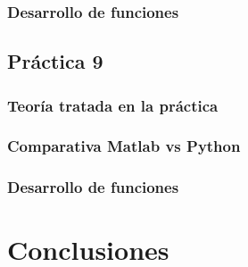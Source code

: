 \documentclass[a4paper,12pt]{report}
\begin{document}
\subsection{Desarrollo de funciones}

\section{ Práctica 9}
\subsection{Teoría tratada en la práctica}
\subsection{Comparativa Matlab vs Python}
\subsection{Desarrollo de funciones}


\chapter{Conclusiones}

\nocite{*}
\printbibliography[heading=bibintoc,title={Bibliography}]
\end{document}
